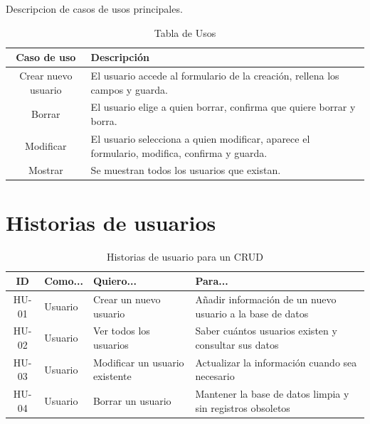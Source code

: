 \documentclass{article}
\begin{document}
Descripcion de casos de usos principales.
\begin{table}[h!]
\centering
\begin{tabular}{|c|p{6cm}|} %
\hline
\textbf{Caso de uso} & \textbf{Descripción} \\
\hline
Crear nuevo usuario & El usuario accede al formulario de la creación, rellena los campos y guarda. \\
\hline
Borrar & El usuario elige a quien borrar, confirma que quiere borrar y borra. \\
\hline
Modificar & El usuario selecciona a quien modificar, aparece el formulario, modifica, confirma y guarda. \\
\hline
Mostrar & Se muestran todos los usuarios que existan. \\
\hline
\end{tabular}
\caption{Tabla de Usos}
\end{table}

\section{Historias de usuarios}

\begin{table}[h!]
\centering
\begin{tabular}{|c|p{3cm}|p{5cm}|p{4cm}|}
\hline
\textbf{ID} & \textbf{Como...} & \textbf{Quiero...} & \textbf{Para...} \\
\hline
HU-01 & Usuario & Crear un nuevo usuario & Añadir información de un nuevo usuario a la base de datos \\
\hline
HU-02 & Usuario & Ver todos los usuarios & Saber cuántos usuarios existen y consultar sus datos \\
\hline
HU-03 & Usuario & Modificar un usuario existente & Actualizar la información cuando sea necesario \\
\hline
HU-04 & Usuario & Borrar un usuario & Mantener la base de datos limpia y sin registros obsoletos \\
\hline
\end{tabular}
\caption{Historias de usuario para un CRUD}
\end{table}
\end{document}
